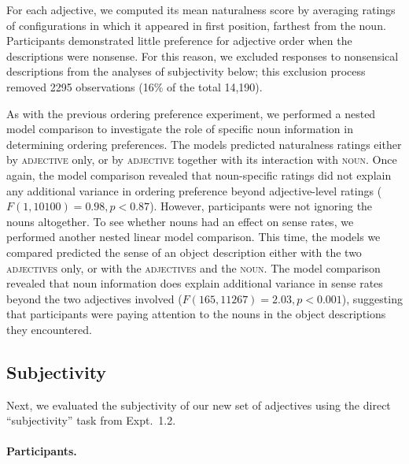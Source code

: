 \documentclass[12pt]{article}
\newcommand{\ndg}[1]{\textcolor{Green}{[ndg: #1]}}
\begin{document}
For each adjective, we computed its mean naturalness score by averaging ratings of configurations in which it appeared in first position, farthest from the noun. Participants demonstrated little preference for adjective order when the descriptions were nonsense. For this reason, we excluded responses to nonsensical descriptions from the analyses of subjectivity below; this exclusion process removed 2295 observations (16\% of the total 14,190).  %

As with the previous ordering preference experiment, we performed a nested model comparison to investigate the role of specific noun information in determining ordering preferences. The models predicted naturalness ratings either by \textsc{adjective} only, or by \textsc{adjective} together with its interaction with \textsc{noun}. Once again, the model comparison revealed that noun-specific ratings did not explain any additional variance in ordering preference 
beyond adjective-level ratings ($F(1,10100) = 0.98, p < 0.87$). However, participants were not ignoring the nouns altogether. To see whether nouns had an effect on sense rates, we performed another nested linear model comparison. This time, the models we compared predicted the sense of an object description either with the two \textsc{adjectives} only, or with the \textsc{adjectives} and the \textsc{noun}. The model comparison revealed that noun information does explain additional variance in sense rates beyond the two adjectives involved ($F(165,11267)=2.03, p<0.001$), suggesting that participants were paying attention to the nouns in the object descriptions they encountered.

\subsection{Subjectivity}

Next, we evaluated the subjectivity of our new set of adjectives using the direct ``subjectivity'' task from Expt.~1.2.

\paragraph{Participants.}
\end{document}

